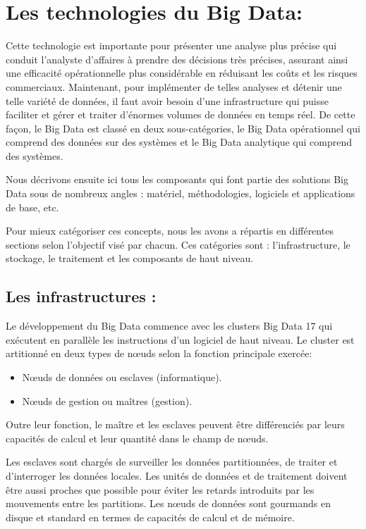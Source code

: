 \section{Les technologies du Big Data:}
Cette technologie est importante pour présenter une analyse plus précise qui conduit l’analyste d’affaires à prendre des décisions très précises, assurant ainsi une efficacité opérationnelle plus considérable en réduisant les coûts et les risques commerciaux. Maintenant, pour implémenter de telles analyses et détenir une telle variété de données, il faut avoir besoin d’une infrastructure qui puisse faciliter et gérer et traiter d’énormes volumes de données en temps réel. De cette façon, le Big Data est classé en deux sous-catégories, le Big Data opérationnel qui comprend des données sur des systèmes et le Big Data analytique qui comprend des systèmes. 

Nous décrivons ensuite ici tous les composants qui font partie des solutions Big Data sous de nombreux angles : matériel, méthodologies, logiciels et applications de base, etc.

Pour mieux catégoriser ces concepts, nous les avons a répartis en différentes sections selon l'objectif visé par chacun. Ces catégories sont : l'infrastructure, le stockage, le traitement et les composants de haut niveau.

\subsection{Les infrastructures :}
Le développement du Big Data commence avec les clusters Big Data 17 qui exécutent en parallèle les instructions d'un logiciel de haut niveau. Le cluster est artitionné en deux types de nœuds selon la fonction principale exercée:

\begin{itemize}\renewcommand{\labelitemi}{$\bullet$}
	\item Nœuds de données ou esclaves (informatique).
	\item Nœuds de gestion ou maîtres (gestion).
\end{itemize}

Outre leur fonction, le maître et les esclaves peuvent être différenciés par leurs capacités de calcul et leur quantité dans le champ de nœuds.

Les esclaves sont chargés de surveiller les données partitionnées, de traiter et d'interroger les données locales. Les unités de données et de traitement doivent être aussi proches que possible pour éviter les retards introduits par les mouvements entre les partitions. Les nœuds de données sont gourmands en disque et standard en termes de capacités de calcul et de mémoire.

